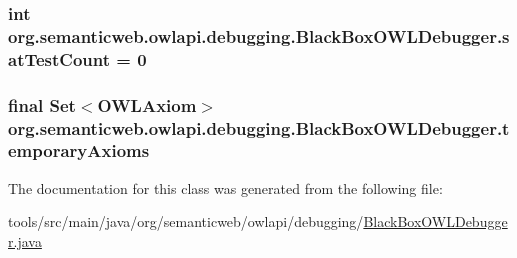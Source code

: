 \hypertarget{classorg_1_1semanticweb_1_1owlapi_1_1debugging_1_1_black_box_o_w_l_debugger_a2a0bb4825a276ac34b66898c9d8fee7a}{
\subsubsection[{sat\-Test\-Count}]{\setlength{\rightskip}{0pt plus 5cm}int org.\-semanticweb.\-owlapi.\-debugging.\-Black\-Box\-O\-W\-L\-Debugger.\-sat\-Test\-Count = 0\hspace{0.3cm}{\ttfamily [private]}}}\label{classorg_1_1semanticweb_1_1owlapi_1_1debugging_1_1_black_box_o_w_l_debugger_a2a0bb4825a276ac34b66898c9d8fee7a}
\hypertarget{classorg_1_1semanticweb_1_1owlapi_1_1debugging_1_1_black_box_o_w_l_debugger_a4c86231c49c4d9146765a9574ccf9c08}{
\subsubsection[{temporary\-Axioms}]{\setlength{\rightskip}{0pt plus 5cm}final Set$<${\bf O\-W\-L\-Axiom}$>$ org.\-semanticweb.\-owlapi.\-debugging.\-Black\-Box\-O\-W\-L\-Debugger.\-temporary\-Axioms\hspace{0.3cm}{\ttfamily [private]}}}\label{classorg_1_1semanticweb_1_1owlapi_1_1debugging_1_1_black_box_o_w_l_debugger_a4c86231c49c4d9146765a9574ccf9c08}


The documentation for this class was generated from the following file\-:\begin{DoxyCompactItemize}
\item 
tools/src/main/java/org/semanticweb/owlapi/debugging/\hyperlink{_black_box_o_w_l_debugger_8java}{Black\-Box\-O\-W\-L\-Debugger.\-java}\end{DoxyCompactItemize}
